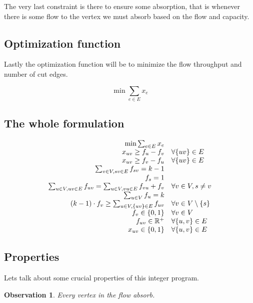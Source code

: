 \documentclass{article}
\theoremstyle{plain}
\newtheorem{observ}[thm]{Observation}
\theoremstyle{plain}
\theoremstyle{remark}
\begin{document}
	The very last constraint is there to ensure some absorption, that is whenever there is some flow to the vertex we must absorb based on the flow and capacity.
	
	\subsection{Optimization function}
	
	Lastly the optimization function will be to minimize the flow throughput and number of cut edges.
	
	$$
	\min \sum_{e \in E} x_e %
	$$
	
	\subsection{The whole formulation}
	
	\begin{equation}
		\begin{array}{r l}
			\min \sum_{e \in E} x_e \\
			x_{uv} \geq f_u - f_v & \forall \{uv\} \in E\\
			x_{uv} \geq f_v - f_u & \forall \{uv\} \in E\\
			\sum_{v \in V, sv \in E} f_{sv} = k-1 \\
			f_s = 1 \\
			\sum_{u \in V, uv \in E} f_{uv} = \sum_{u \in V, vu \in E} f_{vu} + f_v & \forall v \in V, s \neq v \\
			\sum_{u \in V} f_u = k \\
			(k-1) \cdot f_{v} \geq \sum_{u \in V, \{uv\} \in E} f_{uv} & \forall v \in V \setminus \{s\} \\
			f_v \in \{0,1\} & \forall v \in V \\
			f_{uv} \in \mathbb{R}^+ & \forall \{u,v\} \in E \\
			x_{uv} \in \{0,1\} & \forall \{u,v\} \in E
		\end{array}
	\end{equation}
	
	\subsection{Properties}
	
	Lets talk about some crucial properties of this integer program.
	
	\begin{observ}
		Every vertex in the flow absorb.
	\end{observ}
\end{document}
